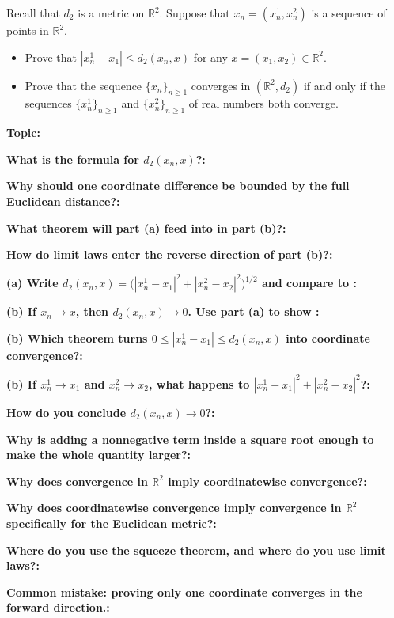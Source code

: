 \documentclass[12pt]{article}
\newcommand{\fillfield}[1]{%
  \par\noindent\textbf{#1:}\enspace\hrulefill\par\vspace{3pt}%
}
\begin{document}
\begin{tcolorbox}[
  enhanced, breakable,
  colback  = probblue,
  colframe = blue!55!black,
  fonttitle = \bfseries,
  title = {\textsc{Problem Statement}\hfill Homework 9, Problem 5}
]
Recall that $d_2$ is a metric on $\mathbb{R}^2$. Suppose that $x_n = (x_n^1, x_n^2)$ is a sequence of
points in $\mathbb{R}^2$.
\begin{itemize}[nosep, leftmargin=1.8em]
  \item[(a)] Prove that $|x_n^1 - x_1| \le d_2(x_n, x)$ for any $x = (x_1, x_2) \in \mathbb{R}^2$.
  \item[(b)] Prove that the sequence $\{x_n\}_{n\ge1}$ converges in $(\mathbb{R}^2, d_2)$ if and only if the sequences
    $\{x_n^1\}_{n\ge1}$ and $\{x_n^2\}_{n\ge1}$ of real numbers both converge.
\end{itemize}
\end{tcolorbox}

\bigskip

\begin{tcolorbox}[
  enhanced, breakable,
  colback  = pass1green,
  colframe = green!55!black,
  fonttitle = \bfseries,
  title = {Pass 1 \enspace\textbf{--}\enspace First Diagnosis}
]
\fillfield{Topic}
\fillfield{What is the formula for $d_2(x_n,x)$?}
\fillfield{Why should one coordinate difference be bounded by the full Euclidean distance?}
\fillfield{What theorem will part (a) feed into in part (b)?}
\fillfield{How do limit laws enter the reverse direction of part (b)?}
\end{tcolorbox}

\bigskip

\begin{tcolorbox}[
  enhanced, breakable,
  colback  = pass2yellow,
  colframe = yellow!65!black,
  fonttitle = \bfseries,
  title = {Pass 2 \enspace\textbf{--}\enspace Proof Recipe Card}
]
\fillfield{(a) Write $d_2(x_n,x) = \bigl(|x_n^1-x_1|^2 + |x_n^2-x_2|^2\bigr)^{1/2}$ and compare to \dotfill}
\fillfield{(b) If $x_n\to x$, then $d_2(x_n,x)\to 0$. Use part (a) to show \dotfill}
\fillfield{(b) Which theorem turns $0\le |x_n^1-x_1| \le d_2(x_n,x)$ into coordinate convergence?}
\fillfield{(b) If $x_n^1\to x_1$ and $x_n^2\to x_2$, what happens to $|x_n^1-x_1|^2 + |x_n^2-x_2|^2$?}
\fillfield{How do you conclude $d_2(x_n,x)\to 0$?}
\end{tcolorbox}

\bigskip

\begin{tcolorbox}[
  enhanced, breakable,
  colback  = pass3orange,
  colframe = orange!65!black,
  fonttitle = \bfseries,
  title = {Pass 3 \enspace\textbf{--}\enspace Self-Explanation}
]
\fillfield{Why is adding a nonnegative term inside a square root enough to make the whole quantity larger?}
\fillfield{Why does convergence in $\mathbb{R}^2$ imply coordinatewise convergence?}
\fillfield{Why does coordinatewise convergence imply convergence in $\mathbb{R}^2$ specifically for the Euclidean metric?}
\fillfield{Where do you use the squeeze theorem, and where do you use limit laws?}
\fillfield{Common mistake: proving only one coordinate converges in the forward direction.}
\end{tcolorbox}
\end{document}
